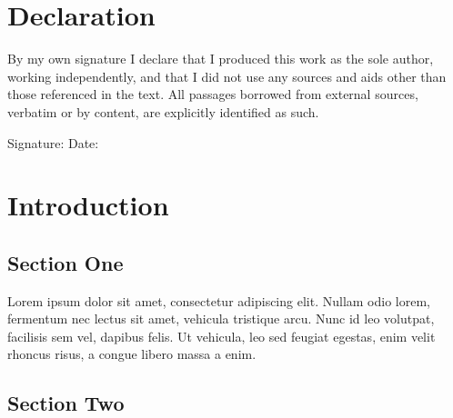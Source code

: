 \documentclass[11pt,a4paper,twoside,openright]{report}
\begin{document}

\tableofcontents
\listoffigures
\listoftables


\chapter*{Declaration}
By my own signature I declare that I produced this work as the sole author, working independently,
and that I did not use any sources and aids other than those referenced in the text.
All passages borrowed from external sources, verbatim or by content, are explicitly identified as
such.\\

\vspace{15mm}

\noindent Signature: \underline{\hspace{5cm}} \hspace{1cm}  Date: \underline{\hspace{5cm}}


\chapter{Introduction}
\label{sec:intro}

\pagestyle{fancy}

\section{Section One}

Lorem ipsum dolor sit amet, consectetur adipiscing elit. Nullam odio lorem, fermentum nec lectus sit amet, vehicula tristique arcu. Nunc id leo volutpat, facilisis sem vel, dapibus felis. Ut vehicula, leo sed feugiat egestas, enim velit rhoncus risus, a congue libero massa a enim.

\section{Section Two}
\end{document}
